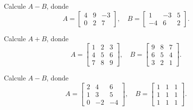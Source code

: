 \begin{ejercicio}
Calcule $A-B$, donde
\[
A=\begin{bmatrix} 4 & 9 & -3 \\ 0 & 2 & 7 \end{bmatrix}, \quad
B=\begin{bmatrix} 1 & -3 & 5 \\ -4 & 6 & 2 \end{bmatrix}.
\]
\end{ejercicio}
\muestraSolucion{
\[
A-B=\begin{bmatrix} 3 & 12 & -8 \\ 4 & -4 & 5 \end{bmatrix}.
\]
}

\begin{ejercicio}
Calcule $A+B$, donde
\[
A=\begin{bmatrix} 1 & 2 & 3 \\ 4 & 5 & 6 \\ 7 & 8 & 9 \end{bmatrix}, \quad
B=\begin{bmatrix} 9 & 8 & 7 \\ 6 & 5 & 4 \\ 3 & 2 & 1 \end{bmatrix}.
\]
\end{ejercicio}
\muestraSolucion{
\[
A+B=\begin{bmatrix} 10 & 10 & 10 \\ 10 & 10 & 10 \\ 10 & 10 & 10 \end{bmatrix}.
\]
}

\begin{ejercicio}
Calcule $A-B$, donde
\[
A=\begin{bmatrix} 2 & 4 & 6 \\ 1 & 3 & 5 \\ 0 & -2 & -4 \end{bmatrix}, \quad
B=\begin{bmatrix} 1 & 1 & 1 \\ 1 & 1 & 1 \\ 1 & 1 & 1 \end{bmatrix}.
\]
\end{ejercicio}
\muestraSolucion{
\[
A-B=\begin{bmatrix} 1 & 3 & 5 \\ 0 & 2 & 4 \\ -1 & -3 & -5 \end{bmatrix}.
\]
}

